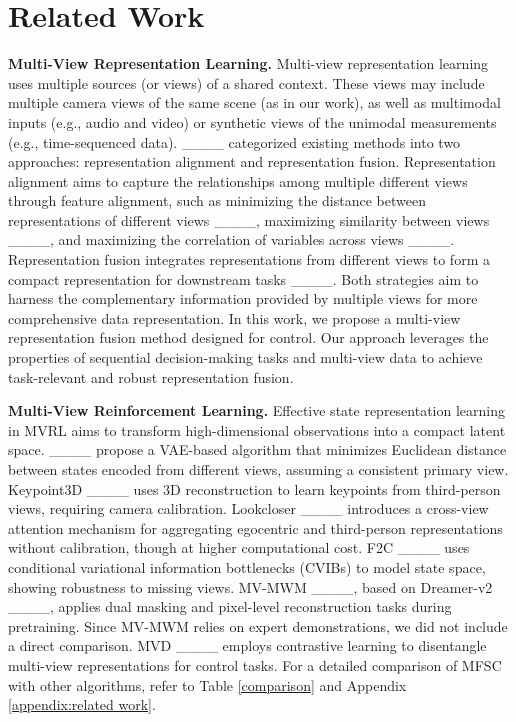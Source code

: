 \section{Related Work}
\textbf{Multi-View Representation Learning.} Multi-view representation learning uses multiple sources (or views) of a shared context. These views may include multiple camera views of the same scene (as in our work), as well as multimodal inputs (e.g., audio and video) or synthetic views of the unimodal measurements (e.g., time-sequenced data). ____ categorized existing methods into two approaches: representation alignment and representation fusion. Representation alignment aims to capture the relationships among multiple different views through feature alignment, such as minimizing the distance between representations of different views ____, maximizing similarity between views ____, and maximizing the correlation of variables across views ____. Representation fusion integrates representations from different views to form a compact representation for downstream tasks ____. Both strategies aim to harness the complementary information provided by multiple views for more comprehensive data representation. In this work, we propose a multi-view representation fusion method designed for control. Our approach leverages the properties of sequential decision-making tasks and multi-view data to achieve task-relevant and robust representation fusion.

\textbf{Multi-View Reinforcement Learning.} Effective state representation learning in MVRL aims to transform high-dimensional observations into a compact latent space. ____ propose a VAE-based algorithm that minimizes Euclidean distance between states encoded from different views, assuming a consistent primary view. Keypoint3D ____ uses 3D reconstruction to learn keypoints from third-person views, requiring camera calibration. Lookcloser ____ introduces a cross-view attention mechanism for aggregating egocentric and third-person representations without calibration, though at higher computational cost. F2C ____ uses conditional variational information bottlenecks (CVIBs) to model state space, showing robustness to missing views. MV-MWM ____, based on Dreamer-v2 ____, applies dual masking and pixel-level reconstruction tasks during pretraining. Since MV-MWM relies on expert demonstrations, we did not include a direct comparison.  MVD ____ employs contrastive learning to disentangle multi-view representations for control tasks. For a detailed comparison of MFSC with other algorithms, refer to Table \ref{comparison} and Appendix \ref{appendix:related work}.